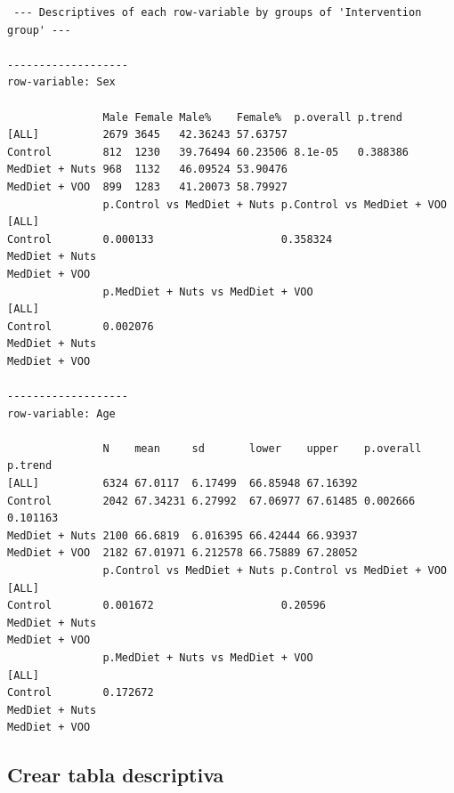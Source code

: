 \documentclass[
]{book}
\begin{document}
\begin{verbatim}
 --- Descriptives of each row-variable by groups of 'Intervention group' ---

------------------- 
row-variable: Sex 

               Male Female Male%    Female%  p.overall p.trend 
[ALL]          2679 3645   42.36243 57.63757                   
Control        812  1230   39.76494 60.23506 8.1e-05   0.388386
MedDiet + Nuts 968  1132   46.09524 53.90476                   
MedDiet + VOO  899  1283   41.20073 58.79927                   
               p.Control vs MedDiet + Nuts p.Control vs MedDiet + VOO
[ALL]                                                                
Control        0.000133                    0.358324                  
MedDiet + Nuts                                                       
MedDiet + VOO                                                        
               p.MedDiet + Nuts vs MedDiet + VOO
[ALL]                                           
Control        0.002076                         
MedDiet + Nuts                                  
MedDiet + VOO                                   

------------------- 
row-variable: Age 

               N    mean     sd       lower    upper    p.overall p.trend 
[ALL]          6324 67.0117  6.17499  66.85948 67.16392                   
Control        2042 67.34231 6.27992  67.06977 67.61485 0.002666  0.101163
MedDiet + Nuts 2100 66.6819  6.016395 66.42444 66.93937                   
MedDiet + VOO  2182 67.01971 6.212578 66.75889 67.28052                   
               p.Control vs MedDiet + Nuts p.Control vs MedDiet + VOO
[ALL]                                                                
Control        0.001672                    0.20596                   
MedDiet + Nuts                                                       
MedDiet + VOO                                                        
               p.MedDiet + Nuts vs MedDiet + VOO
[ALL]                                           
Control        0.172672                         
MedDiet + Nuts                                  
MedDiet + VOO                                   
\end{verbatim}

\hypertarget{crear-tabla-descriptiva}{%
\subsection*{Crear tabla descriptiva}\label{crear-tabla-descriptiva}}
\end{document}
